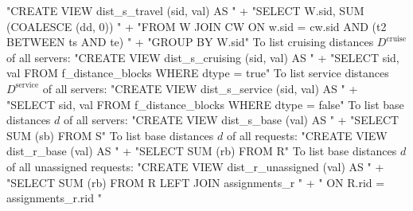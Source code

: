 "CREATE VIEW dist_s_travel (sid, val) AS "
  + "SELECT W.sid, SUM (COALESCE (dd, 0)) "
  + "FROM W JOIN CW ON w.sid = cw.sid AND (t2 BETWEEN ts AND te) "
  + "GROUP BY W.sid"
\nwendcode{}\nwdocspar
To list cruising distances $D^\textrm{cruise}$ of all servers:
\nwenddocs{}\endmoddef{}
"CREATE VIEW dist_s_cruising (sid, val) AS "
  + "SELECT sid, val FROM f_distance_blocks WHERE dtype = true"
\nwendcode{}\nwdocspar
To list service distances $D^\textrm{service}$ of all servers:
\nwenddocs{}\endmoddef{}
"CREATE VIEW dist_s_service (sid, val) AS "
  + "SELECT sid, val FROM f_distance_blocks WHERE dtype = false"
\nwendcode{}\nwdocspar
To list base distances $d$ of all servers:
\nwenddocs{}\endmoddef{}
"CREATE VIEW dist_s_base (val) AS "
  + "SELECT SUM (sb) FROM S"
\nwendcode{}\nwdocspar
To list base distances $d$ of all requests:
\nwenddocs{}\endmoddef{}
"CREATE VIEW dist_r_base (val) AS "
  + "SELECT SUM (rb) FROM R"
\nwendcode{}\nwdocspar
To list base distances $d$ of all unassigned requests:
\nwenddocs{}\endmoddef{}
"CREATE VIEW dist_r_unassigned (val) AS "
  + "SELECT SUM (rb) FROM R LEFT JOIN assignments_r "
  + "  ON R.rid = assignments_r.rid "
